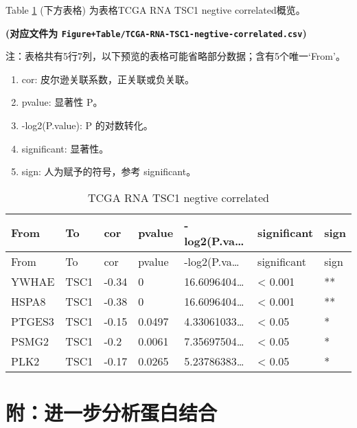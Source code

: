 \documentclass[
]{article}
\providecommand{\tightlist}{%
  \setlength{\itemsep}{0pt}\setlength{\parskip}{0pt}}
\begin{document}
Table \ref{tab:TCGA-RNA-TSC1-negtive-correlated} (下方表格) 为表格TCGA RNA TSC1 negtive correlated概览。

\textbf{(对应文件为 \texttt{Figure+Table/TCGA-RNA-TSC1-negtive-correlated.csv})}

\begin{center}\begin{tcolorbox}[colback=gray!10, colframe=gray!50, width=0.9\linewidth, arc=1mm, boxrule=0.5pt]注：表格共有5行7列，以下预览的表格可能省略部分数据；含有5个唯一`From'。
\end{tcolorbox}
\end{center}
\begin{center}\begin{tcolorbox}[colback=gray!10, colframe=gray!50, width=0.9\linewidth, arc=1mm, boxrule=0.5pt]\begin{enumerate}\tightlist
\item cor:  皮尔逊关联系数，正关联或负关联。
\item pvalue:  显著性 P。
\item -log2(P.value):  P 的对数转化。
\item significant:  显著性。
\item sign:  人为赋予的符号，参考 significant。
\end{enumerate}\end{tcolorbox}
\end{center}

\begin{longtable}[]{@{}lllllll@{}}
\caption{\label{tab:TCGA-RNA-TSC1-negtive-correlated}TCGA RNA TSC1 negtive correlated}\tabularnewline
\toprule
From & To & cor & pvalue & -log2(P.va\ldots{} & significant & sign\tabularnewline
\midrule
\endfirsthead
\toprule
From & To & cor & pvalue & -log2(P.va\ldots{} & significant & sign\tabularnewline
\midrule
\endhead
YWHAE & TSC1 & -0.34 & 0 & 16.6096404\ldots{} & \textless{} 0.001 & **\tabularnewline
HSPA8 & TSC1 & -0.38 & 0 & 16.6096404\ldots{} & \textless{} 0.001 & **\tabularnewline
PTGES3 & TSC1 & -0.15 & 0.0497 & 4.33061033\ldots{} & \textless{} 0.05 & *\tabularnewline
PSMG2 & TSC1 & -0.2 & 0.0061 & 7.35697504\ldots{} & \textless{} 0.05 & *\tabularnewline
PLK2 & TSC1 & -0.17 & 0.0265 & 5.23786383\ldots{} & \textless{} 0.05 & *\tabularnewline
\bottomrule
\end{longtable}

\hypertarget{ux9644ux8fdbux4e00ux6b65ux5206ux6790ux86cbux767dux7ed3ux5408}{%
\section{附：进一步分析蛋白结合}\label{ux9644ux8fdbux4e00ux6b65ux5206ux6790ux86cbux767dux7ed3ux5408}}
\end{document}
